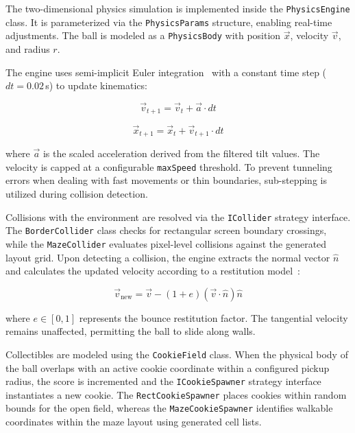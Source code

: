 The two-dimensional physics simulation is implemented inside the \texttt{PhysicsEngine} class. It is parameterized via the \texttt{PhysicsParams} structure, enabling real-time adjustments. The ball is modeled as a \texttt{PhysicsBody} with position $\vec{x}$, velocity $\vec{v}$, and radius $r$.

The engine uses semi-implicit Euler integration~\cite{TRNKA1997277} with a constant time step ($dt = 0.02$\,s) to update kinematics:

\begin{equation}
    \vec{v}_{t+1} = \vec{v}_t + \vec{a} \cdot dt
\end{equation}

\begin{equation}
    \vec{x}_{t+1} = \vec{x}_t + \vec{v}_{t+1} \cdot dt
\end{equation}

where $\vec{a}$ is the scaled acceleration derived from the filtered tilt values. The velocity is capped at a configurable \texttt{maxSpeed} threshold.
To prevent tunneling errors when dealing with fast movements or thin boundaries, sub-stepping is utilized during collision detection.

Collisions with the environment are resolved via the \texttt{ICollider} strategy interface. The \texttt{BorderCollider} class checks for rectangular screen boundary crossings, while the \texttt{MazeCollider} evaluates pixel-level collisions against the generated layout grid.
Upon detecting a collision, the engine extracts the normal vector $\hat{n}$ and calculates the updated velocity according to a restitution model~\cite{wang2017bounce}:

\begin{equation}
    \vec{v}_{\text{new}} = \vec{v} - (1 + e)(\vec{v} \cdot \hat{n})\hat{n}
\end{equation}

where $e \in [0, 1]$ represents the bounce restitution factor. The tangential velocity remains unaffected, permitting the ball to slide along walls.

Collectibles are modeled using the \texttt{CookieField} class.
When the physical body of the ball overlaps with an active cookie coordinate within a configured pickup radius, the score is incremented and the \texttt{ICookieSpawner} strategy interface instantiates a new cookie.
The \texttt{RectCookieSpawner} places cookies within random bounds for the open field, whereas the \texttt{MazeCookieSpawner} identifies walkable coordinates within the maze layout using generated cell lists.

